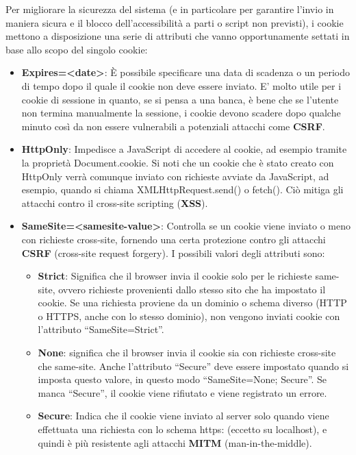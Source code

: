 Per migliorare la sicurezza del sistema (e in particolare per garantire l'invio in maniera sicura e il blocco dell'accessibilità a parti o script non previsti), i cookie mettono a disposizione una serie di attributi che vanno opportunamente settati in base allo scopo del singolo cookie:
\begin{itemize}
	\item \textbf{Expires=<date>}: È possibile specificare una data di scadenza o un periodo
	di tempo dopo il quale il cookie non deve essere inviato. E' molto utile per i cookie di sessione in quanto, se si pensa a una banca, è bene che se l'utente non termina manualmente la sessione, i cookie devono scadere dopo qualche minuto così da non essere vulnerabili a potenziali attacchi come \textbf{CSRF}.
	\item \textbf{HttpOnly}: Impedisce a JavaScript di accedere al cookie, ad esempio tramite la proprietà Document.cookie. Si noti che un cookie che è stato creato con HttpOnly verrà comunque inviato con richieste avviate da JavaScript, ad esempio, quando si chiama XMLHttpRequest.send() o fetch(). Ciò mitiga gli attacchi contro il cross-site scripting (\textbf{XSS}).
	\item \textbf{SameSite=<samesite-value>}: Controlla se un cookie viene inviato o meno con richieste cross-site, fornendo una certa protezione contro gli attacchi \textbf{CSRF} (cross-site request forgery). I possibili valori degli attributi sono:
	\begin{itemize}
		\item \textbf{Strict}: Significa che il browser invia il cookie solo per le richieste same-site, ovvero richieste provenienti dallo stesso sito che ha impostato il cookie. Se una richiesta proviene da un dominio o schema diverso (HTTP o HTTPS, anche con lo stesso dominio), non vengono inviati cookie con l'attributo ``SameSite=Strict''.
		\item \textbf{None}: significa che il browser invia il cookie sia con richieste cross-site che same-site. Anche l'attributo ``Secure'' deve essere impostato quando si imposta questo valore, in questo modo ``SameSite=None; Secure''. Se manca ``Secure'', il cookie viene rifiutato e viene registrato un errore.
		\item \textbf{Secure}: Indica che il cookie viene inviato al server solo quando viene effettuata una richiesta con lo schema https: (eccetto su localhost), e quindi è più resistente agli attacchi \textbf{MITM} (man-in-the-middle).
	\end{itemize}
\end{itemize}

